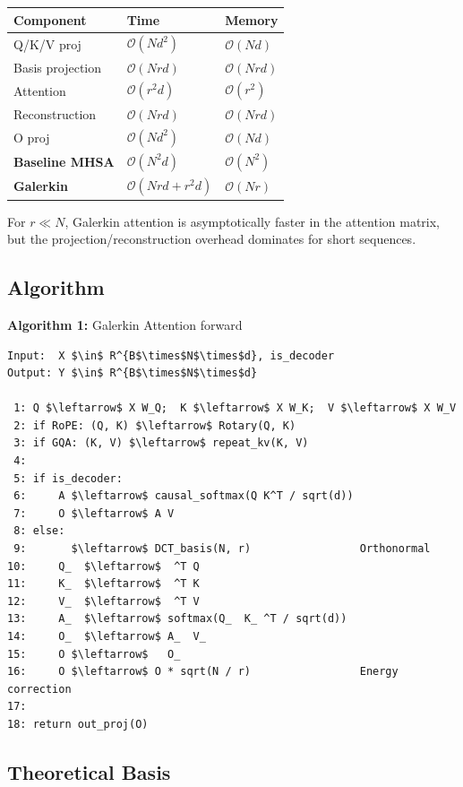\begin{table}[H]
\centering
\small
\begin{tabular}{lll}
\toprule
\textbf{Component} & \textbf{Time} & \textbf{Memory} \\
\midrule
Q/K/V proj & $\mathcal{O}(Nd^2)$ & $\mathcal{O}(Nd)$ \\
Basis projection & $\mathcal{O}(Nrd)$ & $\mathcal{O}(Nrd)$ \\
Attention & $\mathcal{O}(r^2 d)$ & $\mathcal{O}(r^2)$ \\
Reconstruction & $\mathcal{O}(Nrd)$ & $\mathcal{O}(Nrd)$ \\
O proj & $\mathcal{O}(Nd^2)$ & $\mathcal{O}(Nd)$ \\
\textbf{Baseline MHSA} & $\mathcal{O}(N^2 d)$ & $\mathcal{O}(N^2)$ \\
\textbf{Galerkin} & $\mathcal{O}(Nrd + r^2 d)$ & $\mathcal{O}(Nr)$ \\
\bottomrule
\end{tabular}
\end{table}

For $r \ll N$, Galerkin attention is asymptotically faster in the 
attention matrix, but the projection/reconstruction overhead dominates 
for short sequences.

\subsection{Algorithm}

\textbf{Algorithm 1:} Galerkin Attention forward
\begin{lstlisting}
Input:  X $\in$ R^{B$\times$N$\times$d}, is_decoder
Output: Y $\in$ R^{B$\times$N$\times$d}

 1: Q $\leftarrow$ X W_Q;  K $\leftarrow$ X W_K;  V $\leftarrow$ X W_V
 2: if RoPE: (Q, K) $\leftarrow$ Rotary(Q, K)
 3: if GQA: (K, V) $\leftarrow$ repeat_kv(K, V)
 4:
 5: if is_decoder:
 6:     A $\leftarrow$ causal_softmax(Q K^T / sqrt(d))
 7:     O $\leftarrow$ A V
 8: else:
 9:       $\leftarrow$ DCT_basis(N, r)                 Orthonormal
10:     Q_  $\leftarrow$  ^T Q
11:     K_  $\leftarrow$  ^T K
12:     V_  $\leftarrow$  ^T V
13:     A_  $\leftarrow$ softmax(Q_  K_ ^T / sqrt(d))
14:     O_  $\leftarrow$ A_  V_ 
15:     O $\leftarrow$   O_ 
16:     O $\leftarrow$ O * sqrt(N / r)                 Energy correction
17:
18: return out_proj(O)
\end{lstlisting}

\subsection{Theoretical Basis}


